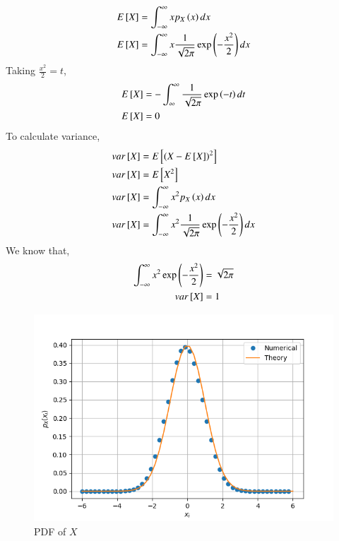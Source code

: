 \documentclass[journal,12pt,twocolumn]{IEEEtran}
\renewcommand\thesection{\arabic{section}}
\begin{document}
\begin{enumerate}[label=\thesection.\arabic*
,ref=\thesection.\theenumi]
\begin{align}
    E{}\left[X\right] &= \int_{-\infty}^{\infty}x p_{X}\left(x\right) dx \\
    E{}\left[X\right] &= \int_{-\infty}^{\infty}x
    \frac{1}{\sqrt{2\pi}}\exp\left(-\frac{x^2}{2}\right) dx    
\end{align}
Taking $\frac{x^2}{2} = t$,
\begin{align}
    E{}\left[X\right] &= -\int_{\infty}^{\infty}
    \frac{1}{\sqrt{2\pi}}\exp\left(-t\right) dt\\
    E{}\left[X\right] &= 0
\end{align}
To calculate variance,
\begin{align}
    var{}\left[X\right] &= E{}\left[(X - E{}\left[X\right])^2\right]\\
    var{}\left[X\right] &= E{}\left[X^2\right]\\
    var{}\left[X\right] &= \int_{-\infty}^{\infty}x^2 p_{X}\left(x\right) dx \\
    var{}\left[X\right] &= \int_{-\infty}^{\infty}x^2
    \frac{1}{\sqrt{2\pi}}\exp\left(-\frac{x^2}{2}\right) dx 
\end{align}
We know that,
\begin{align}
    \int_{-\infty}^{\infty}x^2\exp\left(-\frac{x^2}{2}\right) &= \sqrt{2\pi}\\
    var{}\left[X\right] &= 1
\end{align}
\begin{figure}[h!]
    \centering
    \includegraphics[width=\columnwidth]{./figs/2.3.png}
    \caption{PDF of $X$}
    \label{fig:my_label}
\end{figure}
\begin{figure}[h!]
    \centering

\end{figure}
\end{enumerate}
\end{document}
